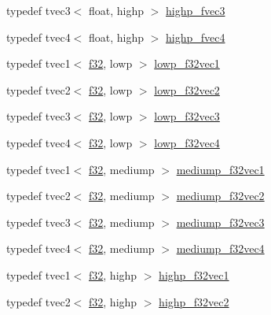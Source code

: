 \begin{DoxyCompactItemize}
\item 
typedef tvec3$<$ float, highp $>$ \hyperlink{namespaceglm_ab0a3090b342f2a6f85a1c0b3b9f818f8}{highp\+\_\+fvec3}
\item 
typedef tvec4$<$ float, highp $>$ \hyperlink{namespaceglm_a42aa7520bab0f5baf5ad92ebcc257eb5}{highp\+\_\+fvec4}
\item 
typedef tvec1$<$ \hyperlink{group__gtc__type__precision_ga0ec999b57f5330d9021256e96038df04}{f32}, lowp $>$ \hyperlink{namespaceglm_acadcba10231e2ba826ef5795f524daad}{lowp\+\_\+f32vec1}
\item 
typedef tvec2$<$ \hyperlink{group__gtc__type__precision_ga0ec999b57f5330d9021256e96038df04}{f32}, lowp $>$ \hyperlink{namespaceglm_a4e41fc469ff2c4f82bfc01fab531ec84}{lowp\+\_\+f32vec2}
\item 
typedef tvec3$<$ \hyperlink{group__gtc__type__precision_ga0ec999b57f5330d9021256e96038df04}{f32}, lowp $>$ \hyperlink{namespaceglm_a20fd0e645527d92ef2cc90fd9f381b77}{lowp\+\_\+f32vec3}
\item 
typedef tvec4$<$ \hyperlink{group__gtc__type__precision_ga0ec999b57f5330d9021256e96038df04}{f32}, lowp $>$ \hyperlink{namespaceglm_a4195c4bf218285be96f8ea5dddbb76c0}{lowp\+\_\+f32vec4}
\item 
typedef tvec1$<$ \hyperlink{group__gtc__type__precision_ga0ec999b57f5330d9021256e96038df04}{f32}, mediump $>$ \hyperlink{namespaceglm_a4894402299b6c47131fb40ed6dbcbfd0}{mediump\+\_\+f32vec1}
\item 
typedef tvec2$<$ \hyperlink{group__gtc__type__precision_ga0ec999b57f5330d9021256e96038df04}{f32}, mediump $>$ \hyperlink{namespaceglm_ad9295a48381e62085e37416504b11932}{mediump\+\_\+f32vec2}
\item 
typedef tvec3$<$ \hyperlink{group__gtc__type__precision_ga0ec999b57f5330d9021256e96038df04}{f32}, mediump $>$ \hyperlink{namespaceglm_a847e98e715459420de18bff43cbc49f6}{mediump\+\_\+f32vec3}
\item 
typedef tvec4$<$ \hyperlink{group__gtc__type__precision_ga0ec999b57f5330d9021256e96038df04}{f32}, mediump $>$ \hyperlink{namespaceglm_ae6f5c8dc9aed588de6a4abe14802e161}{mediump\+\_\+f32vec4}
\item 
typedef tvec1$<$ \hyperlink{group__gtc__type__precision_ga0ec999b57f5330d9021256e96038df04}{f32}, highp $>$ \hyperlink{namespaceglm_a8521171274ff387f66c871c8eeeab719}{highp\+\_\+f32vec1}
\item 
typedef tvec2$<$ \hyperlink{group__gtc__type__precision_ga0ec999b57f5330d9021256e96038df04}{f32}, highp $>$ \hyperlink{namespaceglm_a4c290649029a7243cd9153f8411d5c40}{highp\+\_\+f32vec2}

\end{DoxyCompactItemize}
